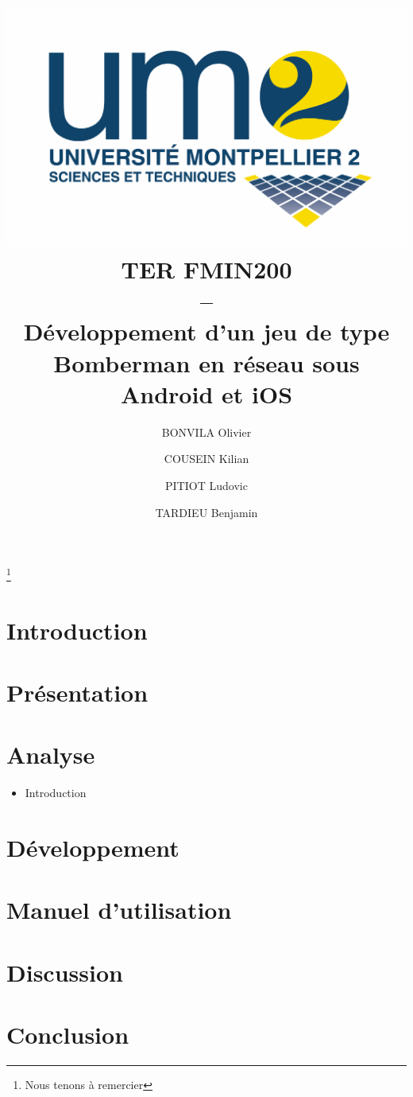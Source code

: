 \documentclass[a4paper,11pt]{report}
\title{
	\includegraphics[scale=.2]{logofds.eps}\\
	\vspace*{1cm}
	TER FMIN200 \\ 
	-- \\
	Développement d'un jeu de type Bomberman en réseau sous Android et iOS
}
\author{BONVILA Olivier \and COUSEIN Kilian \and PITIOT Ludovic \and TARDIEU Benjamin}
\date{}
\begin{document}
\maketitle

\thanks{

  Nous tenons à remercier 

}

\tableofcontents


\chapter{Introduction}

	

\chapter{Présentation}

	
	
	
\chapter{Analyse}
	\begin{itemize}
		\item{Introduction}
	\end{itemize}
	
	
	


\chapter{Développement}

	
	
		
		
		
\chapter{Manuel d'utilisation}

	

	

\chapter{Discussion}

	

	
			
\chapter{Conclusion}

	
\end{document}
